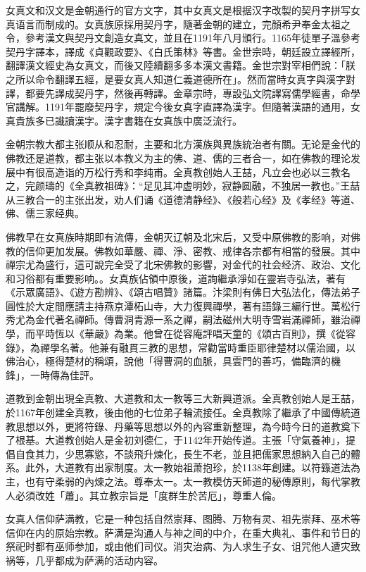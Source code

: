 女真文和汉文是金朝通行的官方文字，其中女真文是根据汉字改製的契丹字拼写女真语言而制成的。女真族原採用契丹字，隨著金朝的建立，完顏希尹奉金太祖之令，參考漢文與契丹文創造女真文，並且在1191年八月頒行。1165年徒單子溫參考契丹字譯本，譯成《貞觀政要》、《白氏策林》等書。金世宗時，朝廷設立譯經所，翻譯漢文經史為女真文，而後又陸續翻多多本漢文書籍。金世宗對宰相們說：「朕之所以命令翻譯五經，是要女真人知道仁義道德所在」。然而當時女真字與漢字對譯，都要先譯成契丹字，然後再轉譯。金章宗時，專設弘文院譯寫儒學經書，命學官講解。1191年罷廢契丹字，規定今後女真字直譯為漢字。但隨著漢語的通用，女真貴族多已識讀漢字。漢字書籍在女真族中廣泛流行。

金朝宗教大都主张顺从和忍耐，主要和北方漢族與異族統治者有關。无论是金代的佛教还是道教，都主张以本教义为主的佛、道、儒的三者合一，如在佛教的理论发展中有很高造诣的万松行秀和李纯甫。全真教创始人王喆，凡立会也必以三教名之，完颜璹的《全真教祖碑》：“足见其冲虚明妙，寂静圆融，不独居一教也。”王喆从三教合一的主张出发，劝人们诵《道德清静经》、《般若心经》及《孝经》等道、佛、儒三家经典。

佛教早在女真族時期即有流傳，金朝灭辽朝及北宋后，又受中原佛教的影响，对佛教的信仰更加发展。佛教如華嚴、禪、淨、密教、戒律各宗都有相當的發展。其中禪宗尤為盛行，這可說完全受了北宋佛教的影響，对金代的社会经济、政治、文化和习俗都有重要影响。。女真族佔領中原後，道詢繼承淨如在靈岩寺弘法，著有《示眾廣語》、《遊方勘辨》、《頌古唱贊》諸篇。汴梁則有佛日大弘法化，傳法弟子圓性於大定間應請主持燕京潭柘山寺，大力復興禪學，著有語錄三編行世。萬松行秀尤為金代著名禪師。傳曹洞青源一系之禪，嗣法磁州大明寺雪岩滿禪師，雖治禪學，而平時恆以《華嚴》為業。他曾在從容庵評唱天童的《頌古百則》，撰《從容錄》，為禪學名著。他兼有融貫三教的思想，常勸當時重臣耶律楚材以儒治國，以佛治心，極得楚材的稱頌，說他「得曹洞的血脈，具雲門的善巧，備臨濟的機鋒」，一時傳為佳評。

道教到金朝出現全真教、大道教和太一教等三大新興道派。全真教创始人是王喆，於1167年创建全真教，後由他的七位弟子輪流接任。全真教除了繼承了中國傳統道教思想以外，更將符錄、丹藥等思想以外的內容重新整理，為今時今日的道教奠下了根基。大道教创始人是金初刘德仁，于1142年开始传道。主張「守氣養神」，提倡自食其力，少思寡慾，不談飛升煉化，長生不老，並且把儒家思想納入自己的體系。此外，大道教有出家制度。太一教始祖萧抱珍，於1138年創建。以符籙道法為主，也有守柔弱的內煉之法。尊奉太一。太一教模仿天師道的秘傳原則，每代掌教人必須改姓「蕭」。其立教宗旨是「度群生於苦厄」，尊重人倫。

女真人信仰萨满教，它是一种包括自然崇拜、图腾、万物有灵、祖先崇拜、巫术等信仰在内的原始宗教。萨满是沟通人与神之间的中介，在重大典礼、事件和节日的祭祀时都有巫师参加，或由他们司仪。消灾治病、为人求生子女、诅咒他人遭灾致祸等，几乎都成为萨满的活动内容。

